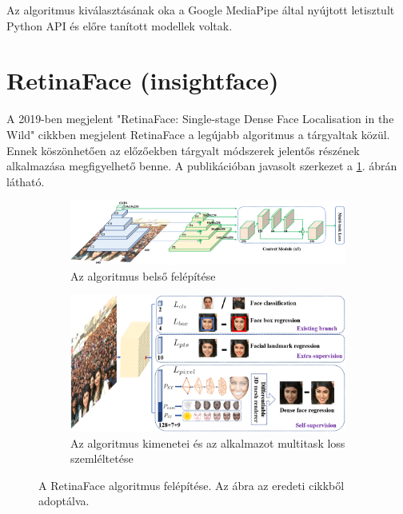 Az algoritmus kiválasztásának oka a Google MediaPipe\cite{noauthor_mediapipe_nodate} által nyújtott letisztult Python API és előre tanított modellek voltak. 

\section{RetinaFace (insightface)}
A 2019-ben megjelent "RetinaFace: Single-stage Dense Face Localisation in the Wild"\cite{deng_retinaface_2019} cikkben megjelent RetinaFace a legújabb algoritmus a tárgyaltak közül. Ennek köszönhetően az előzőekben tárgyalt módszerek jelentős részének alkalmazása megfigyelhető benne. A publikációban javasolt szerkezet a
\ref{fig:retinaface}. ábrán látható.

\begin{figure}[h]
    \centering
    \begin{subfigure}[b]{\linewidth}
        \includegraphics[width=\linewidth]{figures/retinaface_framework.png}
        \caption{Az algoritmus belső felépítése}
    \end{subfigure}
    \begin{subfigure}[b]{0.75\linewidth}
        \includegraphics[width=\linewidth]{figures/retinaface_multitaskloss.png}
        \caption{Az algoritmus kimenetei és az alkalmazot multitask loss szemléltetése}
    \end{subfigure}
    \caption{A RetinaFace algoritmus felépítése. Az ábra az eredeti cikkből\cite{deng_retinaface_2019} adoptálva.}
    \label{fig:retinaface}
\end{figure}

